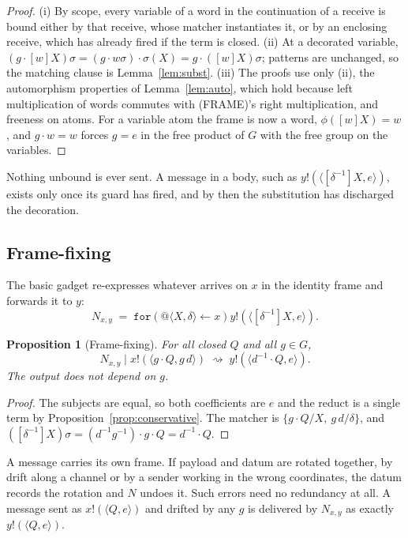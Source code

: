 \documentclass[11pt]{article}
\makeatletter
\newtheorem{proposition}[theorem]{Proposition}
\theoremstyle{definition}
\theoremstyle{remark}
\newcommand{\rcv}[3]{\mathtt{for}(#1 \leftarrow #2)#3}
\newcommand{\out}[3]{#1!(\langle #2, #3\rangle)}
\newcommand{\qn}[2]{@\langle #1, #2\rangle}
\newcommand{\act}[2]{#1\cdot #2}
\newcommand{\red}{\rightsquigarrow}
\newcommand{\fr}[2]{[#1]#2}
\makeatother
\begin{document}
\begin{proof}
(i) By scope, every variable of a word in the continuation of a receive is
bound either by that receive, whose matcher instantiates it, or by an
enclosing receive, which has already fired if the term is closed. (ii) At a
decorated variable,
$(\act{g}{\fr{w}{X}})\sigma=\act{(g\cdot w\sigma)}{\sigma(X)}
=\act{g}{(\fr{w}{X})\sigma}$; patterns are unchanged, so the matching clause
is Lemma~\ref{lem:subst}. (iii) The proofs use only (ii), the automorphism
properties of Lemma~\ref{lem:auto}, which hold because left multiplication of
words commutes with (FRAME)'s right multiplication, and freeness on atoms. For
a variable atom the frame is now a word, $\phi(\fr{w}{X})=w$, and
$g\cdot w=w$ forces $g=e$ in the free product of $G$ with the free group on
the variables.
\end{proof}

Nothing unbound is ever sent. A message in a body, such as
$\out{y}{\fr{\delta^{-1}}{X}}{e}$, exists only once its guard has fired, and
by then the substitution has discharged the decoration.

\subsection{Frame-fixing}

The basic gadget re-expresses whatever arrives on $x$ in the identity frame
and forwards it to $y$:
\[
N_{x,y} \;=\; \rcv{\qn{X}{\delta}}{x}{\out{y}{\fr{\delta^{-1}}{X}}{e}}.
\]

\begin{proposition}[Frame-fixing]\label{prop:framefix}
For all closed $Q$ and all $g\in G$,
\[
N_{x,y}\mid\out{x}{\act{g}{Q}}{g\,d}\;\red\;\out{y}{\act{d^{-1}}{Q}}{e}.
\]
The output does not depend on $g$.
\end{proposition}

\begin{proof}
The subjects are equal, so both coefficients are $e$ and the reduct is a
single term by Proposition~\ref{prop:conservative}. The matcher is
$\{\act{g}{Q}/X,\ g\,d/\delta\}$, and
$(\fr{\delta^{-1}}{X})\sigma=\act{(d^{-1}g^{-1})}{\act{g}{Q}}=\act{d^{-1}}{Q}$.
\end{proof}

A message carries its own frame. If payload and datum are rotated together,
by drift along a channel or by a sender working in the wrong coordinates,
the datum records the rotation and $N$ undoes it. Such errors need no
redundancy at all. A message sent as $\out{x}{Q}{e}$ and drifted by any $g$
is delivered by $N_{x,y}$ as exactly $\out{y}{Q}{e}$.
\end{document}
